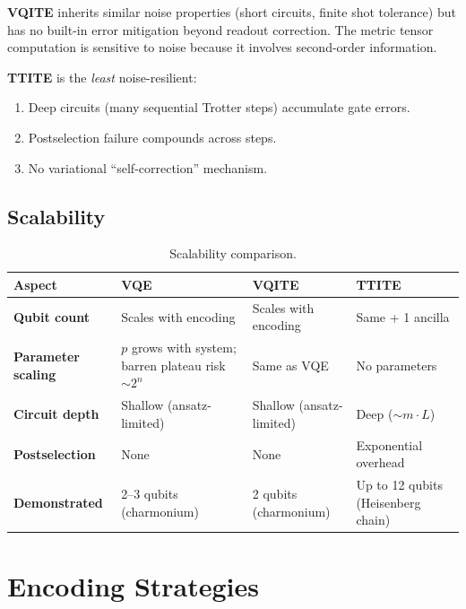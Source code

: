 \documentclass[11pt,a4paper]{article}
\begin{document}
\textbf{VQITE} inherits similar noise properties (short circuits, finite
shot tolerance) but has no built-in error mitigation beyond readout correction.
The metric tensor computation is sensitive to noise because it involves
second-order information.

\textbf{TTITE} is the \emph{least} noise-resilient:
\begin{enumerate}[nosep]
  \item Deep circuits (many sequential Trotter steps) accumulate gate errors.
  \item Postselection failure compounds across steps.
  \item No variational ``self-correction'' mechanism.
\end{enumerate}

\subsection{Scalability}

\begin{table}[h]
\centering
\small
\begin{tabular}{@{}l p{3.8cm} p{3.8cm} p{3.8cm}@{}}
\toprule
Aspect & VQE & VQITE & TTITE \\
\midrule
\textbf{Qubit count}
& Scales with encoding
& Scales with encoding
& Same + 1 ancilla \\
\textbf{Parameter scaling}
& $p$ grows with system; barren plateau risk $\sim 2^n$
& Same as VQE
& No parameters \\
\textbf{Circuit depth}
& Shallow (ansatz-limited)
& Shallow (ansatz-limited)
& Deep ($\sim m \cdot L$) \\
\textbf{Postselection}
& None
& None
& Exponential overhead \\
\textbf{Demonstrated}
& 2--3 qubits (charmonium)
& 2 qubits (charmonium)
& Up to 12 qubits (Heisenberg chain) \\
\bottomrule
\end{tabular}
\caption{Scalability comparison.}
\label{tab:scalability}
\end{table}


\section{Encoding Strategies}
\label{sec:encoding}
\end{document}
